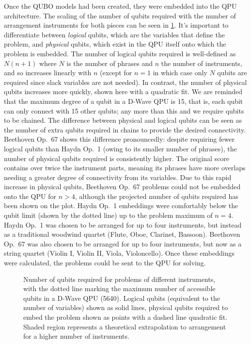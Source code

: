 \documentclass[12pt]{article}
\theoremstyle{definition}
\begin{document}
Once the QUBO models had been created, they were embedded into the QPU architecture. The scaling of the number of qubits required with the number of arrangement instruments for both pieces can be seen in \cref{fig:qubits}. It's important to differentiate between \emph{logical} qubits, which are the variables that define the problem, and \emph{physical} qubits, which exist in the QPU itself onto which the problem is embedded. The number of logical qubits required is well-defined as $N(n+1)$ where $N$ is the number of phrases and $n$ the number of instruments, and so increases linearly with $n$ (except for $n=1$ in which case only $N$ qubits are required since slack variables are not needed). In contrast, the number of physical qubits increases more quickly, shown here with a quadratic fit. We are reminded that the maximum degree of a qubit in a D-Wave QPU is \num{15}, that is, each qubit can only connect with \num{15} other qubits; any more than this and we require qubits to be chained. The difference between physical and logical qubits can be seen as the number of extra qubits required in chains to provide the desired connectivity. Beethoven Op.\ 67 shows this difference pronouncedly: despite requiring fewer logical qubits than Haydn Op.\ 1 (owing to its smaller number of phrases), the number of physical qubits required is consistently higher. The original score contains over twice the instrument parts, meaning its phrases have more overlaps needing a greater degree of connectivity from its variables. Due to this rapid increase in physical qubits, Beethoven Op.\ 67 problems could not be embedded onto the QPU for $n>4$, although the projected number of qubits required has been shown on the plot. Haydn Op.\ 1 embeddings were comfortably below the qubit limit (shown by the dotted line) up to the problem maximum of $n=4$. Haydn Op.\ 1 was chosen to be arranged for up to four instruments, but instead as a traditional woodwind quartet (Flute, Oboe, Clarinet, Bassoon). Beethoven Op.\ 67 was also chosen to be arranged for up to four instruments, but now as a string quartet (Violin I, Violin II, Viola, Violoncello). Once these embeddings were calculated, the problems could be sent to the QPU for solving.

\begin{figure}[ht]
    \centering\footnotesize
    
    \caption[Number of qubits required for problems of different instruments.]{Number of qubits required for problems of different instruments, with the dotted line marking the maximum number of accessible qubits in a D-Wave QPU (\num{5640}). Logical qubits (equivalent to the number of variables) shown as solid lines, physical qubits required to embed the problem shown as points with a dashed line quadratic fit. Shaded region represents a theoretical extrapolation to arrangement for a higher number of instruments.}
    \label{fig:qubits}
\end{figure}
\end{document}
